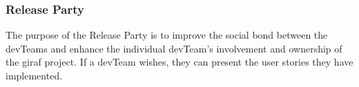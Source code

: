 \subsubsection{Release Party}

The purpose of the Release Party is to improve the social bond between the \glspl{devTeam} and enhance the individual \gls{devTeam}'s involvement and ownership of the \gls{giraf} project. If a \gls{devTeam} wishes, they can present the user stories they have implemented.


